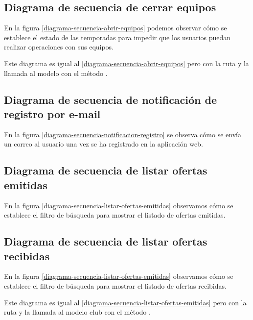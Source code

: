 \subsection*{Diagrama de secuencia de cerrar equipos}
En la figura \ref{diagrama-secuencia-abrir-equipos} podemos observar cómo se
establece el estado de las temporadas para impedir que los usuarios puedan
realizar operaciones con sus equipos.

Este diagrama es igual al \ref{diagrama-secuencia-abrir-equipos} pero con la
ruta  y la llamada al modelo con el método
.


\subsection*{Diagrama de secuencia de notificación de registro por e-mail}
En la figura \ref{diagrama-secuencia-notificacion-registro} se observa cómo se
envía un correo al usuario una vez se ha registrado en la aplicación web.



\subsection*{Diagrama de secuencia de listar ofertas emitidas}
En la figura \ref{diagrama-secuencia-listar-ofertas-emitidas} observamos cómo se
establece el filtro de búsqueda para mostrar el listado de ofertas emitidas.


\subsection*{Diagrama de secuencia de listar ofertas recibidas}
En la figura \ref{diagrama-secuencia-listar-ofertas-emitidas} observamos cómo se
establece el filtro de búsqueda para mostrar el listado de ofertas recibidas.

Este diagrama es igual al \ref{diagrama-secuencia-listar-ofertas-emitidas} pero
con la ruta  y la llamada al modelo club con
el método .

